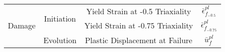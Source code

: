 \begin{table}[]
\begin{tabular}{cccc}
\multirow{3}{*}{Damage}  & \multirow{2}{*}{Initiation}                                                            & Yield Strain at -0.5 Triaxiality   & $\bar{\epsilon}^{pl}_{f_{-0.5}}$  \\
                         &                                                                                        & Yield Strain at -0.75 Triaxiality  & $\bar{\epsilon}^{pl}_{f_{-0.75}}$ \\
                         & Evolution                                                                              & Plastic Displacement at Failure    & $\bar{u}^{pl}_f$                  \\ \cline{2-4} 
\end{tabular}
\end{table}